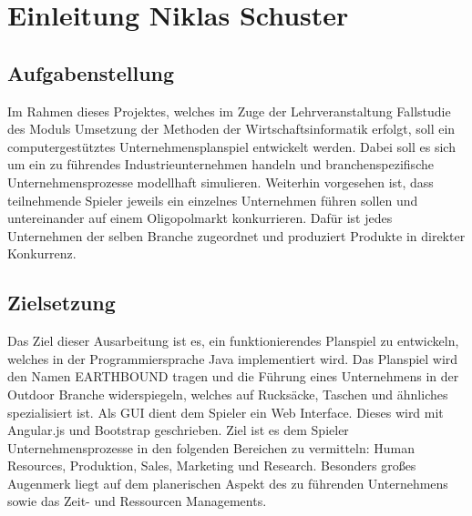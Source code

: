 \chapter{Einleitung \textnormal{\textsf{\small{Niklas Schuster}}}}
\section{Aufgabenstellung}
Im Rahmen dieses Projektes, welches im Zuge der Lehrveranstaltung Fallstudie des Moduls Umsetzung der Methoden der Wirtschaftsinformatik erfolgt, soll ein computergestütztes Unternehmensplanspiel entwickelt werden. Dabei soll es sich um ein zu führendes Industrieunternehmen handeln und branchenspezifische Unternehmensprozesse modellhaft simulieren. Weiterhin vorgesehen ist, dass teilnehmende Spieler jeweils ein einzelnes Unternehmen führen sollen und untereinander auf einem Oligopolmarkt konkurrieren. Dafür ist jedes Unternehmen der selben Branche zugeordnet und produziert Produkte in direkter Konkurrenz.
\section{Zielsetzung}
Das Ziel dieser Ausarbeitung ist es, ein funktionierendes Planspiel zu entwickeln, welches in der Programmiersprache Java implementiert wird. Das Planspiel wird den Namen EARTHBOUND tragen und die Führung eines Unternehmens in der Outdoor Branche widerspiegeln, welches auf Rucksäcke, Taschen und ähnliches spezialisiert ist. Als GUI dient dem Spieler ein Web Interface. Dieses wird mit Angular.js und Bootstrap geschrieben. Ziel ist es dem Spieler Unternehmensprozesse in den folgenden Bereichen zu vermitteln: Human Resources, Produktion, Sales, Marketing und Research. Besonders großes Augenmerk liegt auf dem planerischen Aspekt des zu führenden Unternehmens sowie das Zeit- und Ressourcen Managements.
